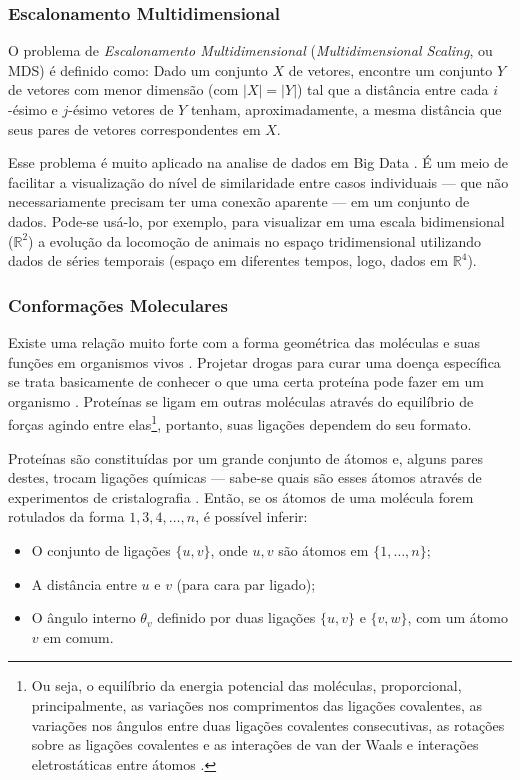 \subsubsection{Escalonamento Multidimensional}

O problema de \textit{Escalonamento Multidimensional} (\textit{Multidimensional Scaling}, ou MDS)
é definido como: Dado um conjunto $X$ de vetores, encontre um conjunto $Y$ de vetores com menor dimensão (com $|X| = |Y|$) tal que a distância entre cada $i$-ésimo e $j$-ésimo vetores de $Y$ tenham, aproximadamente, a mesma distância que seus pares de vetores correspondentes em $X$.

Esse problema é muito aplicado na analise de dados em Big Data \cite{libertiEDG}. É um meio de facilitar a visualização do nível de similaridade entre casos individuais --- que não necessariamente precisam ter uma conexão aparente --- em um conjunto de dados. Pode-se usá-lo, por exemplo, para visualizar em uma escala bidimensional ($\mathbb{R}^2$) a evolução da locomoção de animais no espaço tridimensional utilizando dados de séries temporais (espaço em diferentes tempos, logo, dados em $\mathbb{R}^4$).

\subsubsection{Conformações Moleculares}

Existe uma relação muito forte com a forma geométrica das moléculas e suas funções em organismos vivos \cite{bioquimicaLehninger}. Projetar drogas para curar uma doença específica se trata basicamente de conhecer o que uma certa proteína pode fazer em um organismo \cite{libertiEDG}. Proteínas se ligam em outras moléculas através do equilíbrio de forças agindo entre elas\footnote{Ou seja, o equilíbrio da energia potencial das moléculas, proporcional, principalmente, as variações nos comprimentos das ligações covalentes, as variações nos ângulos entre duas ligações covalentes consecutivas, as rotações sobre as ligações covalentes e as interações de van der Waals e interações eletrostáticas entre átomos \cite{carlileTese}.}, portanto, suas ligações dependem do seu formato. 

Proteínas são constituídas por um grande conjunto de átomos e, alguns pares destes, trocam ligações químicas --- sabe-se quais são esses átomos através de experimentos de cristalografia \cite{ramachandran1974MolStructure}. Então, se os átomos de uma molécula forem rotulados da forma $1,3,4,\dots,n$, é possível inferir: 
\begin{itemize}
	\item O conjunto de ligações $\{u,v\}$, onde $u,v$ são átomos em $\{1,\dots,n\}$;
	\item A distância entre $u$ e $v$ (para cara par ligado);
	\item O ângulo interno $\theta_v$ definido por duas ligações $\{u,v\}$ e $\{v,w\}$, com um átomo $v$ em comum.
\end{itemize} 

